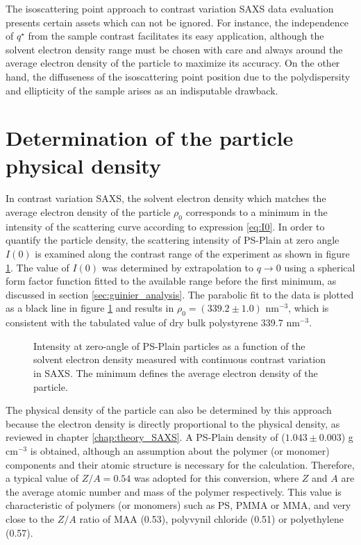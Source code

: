 The isoscattering point approach to contrast variation SAXS data evaluation presents certain assets which can not be ignored. For instance, the independence of $q^{\star}$ from the sample contrast facilitates its easy application, although the solvent electron density range must be chosen with care and always around the average electron density of the particle to maximize its accuracy. On the other hand, the diffuseness of the isoscattering point position due to the polydispersity and ellipticity of the sample arises as an indisputable drawback.

\section{Determination of the particle physical density}
\label{sec:physical_density}
In contrast variation SAXS, the solvent electron density which matches the average electron density of the particle $\rho_0$ corresponds to a minimum in the intensity of the scattering curve  according to expression \ref{eq:I0}. In order to quantify the particle density, the scattering intensity of PS-Plain at zero angle $I(0)$ is examined along the contrast range of the experiment as shown in figure \ref{fig:PSPlainAverageDensity}. The value of $I(0)$ was determined by extrapolation to $q\rightarrow 0$ using a spherical form factor function fitted to the available range before the first minimum, as discussed in section \ref{sec:guinier_analysis}. The parabolic fit to the data is plotted as a black line in figure \ref{fig:PSPlainAverageDensity} and results in $\rho_0=\left(339.2\pm1.0\right)$ nm$^{-3}$, which is consistent with the tabulated value of dry bulk polystyrene 339.7 nm$^{-3}$\citep{dingenouts_analysis_1999}.


\begin{figure}
	\begin{center}
		
	\end{center}
	\caption{Intensity at zero-angle of PS-Plain particles as a function of the solvent electron density measured with continuous contrast variation in SAXS. The minimum defines the average electron density of the particle.}
	\label{fig:PSPlainAverageDensity}
\end{figure}

The physical density of the particle can also be determined by this approach because the electron density is directly proportional to the physical density, as reviewed in chapter \ref{chap:theory_SAXS}. A PS-Plain density of ($1.043\pm0.003$) g cm$^{-3}$ is obtained, although an assumption about the polymer (or monomer) components and their atomic structure is necessary for the calculation. Therefore, a typical value of $Z/A=0.54$ was adopted for this conversion, where $Z$ and $A$ are the average atomic number and mass of the polymer respectively. This value is characteristic of polymers (or monomers) such as PS, PMMA or MMA, and very close to the $Z/A$ ratio of MAA (0.53), polyvynil chloride (0.51) or polyethylene (0.57).


